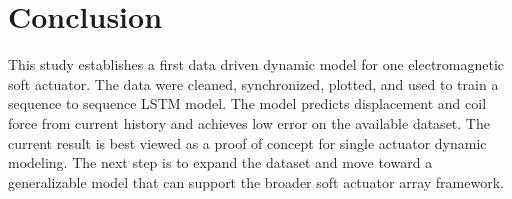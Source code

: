 \documentclass[11pt]{article}
\begin{document}
\section{Conclusion}

This study establishes a first data driven dynamic model for one electromagnetic soft actuator. The data were cleaned, synchronized, plotted, and used to train a sequence to sequence LSTM model. The model predicts displacement and coil force from current history and achieves low error on the available dataset. The current result is best viewed as a proof of concept for single actuator dynamic modeling. The next step is to expand the dataset and move toward a generalizable model that can support the broader soft actuator array framework.
\end{document}
